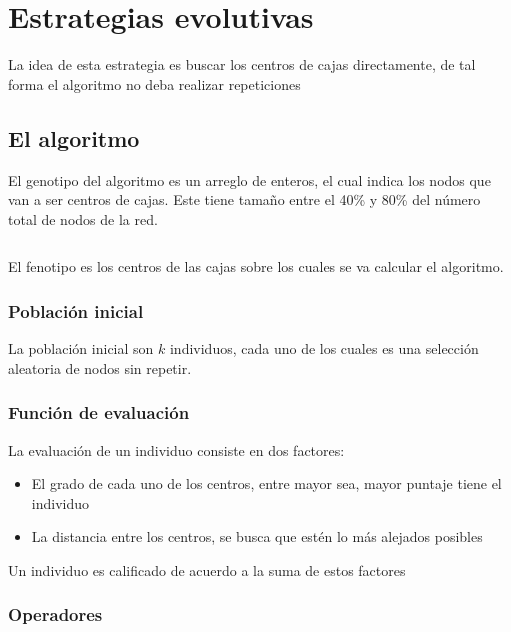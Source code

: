 \section{Estrategias evolutivas}

La idea de esta estrategia es buscar los centros de cajas directamente, de tal forma el algoritmo no deba realizar repeticiones

\subsection{El algoritmo}

El genotipo del algoritmo es un arreglo de enteros, el cual indica los nodos que van a ser centros de cajas. Este tiene tamaño entre el 40\% y 80\% del número total de nodos de la red.

\begin{equation}
    [a_1,a_2,a_3,\cdots,a_n]
\end{equation}

El fenotipo es los centros de las cajas sobre los cuales se va calcular el algoritmo.

\subsubsection{Población inicial}

La población inicial son $k$ individuos, cada uno de los cuales es una selección aleatoria de nodos sin repetir.

\subsubsection{Función de evaluación}

La evaluación de un individuo consiste en dos factores:

\begin{itemize}
    \item El grado de cada uno de los centros, entre mayor sea, mayor puntaje tiene el individuo
    \item La distancia entre los centros, se busca que estén lo más alejados posibles
\end{itemize}

Un individuo es calificado de acuerdo a la suma de estos factores

\subsubsection{Operadores}

